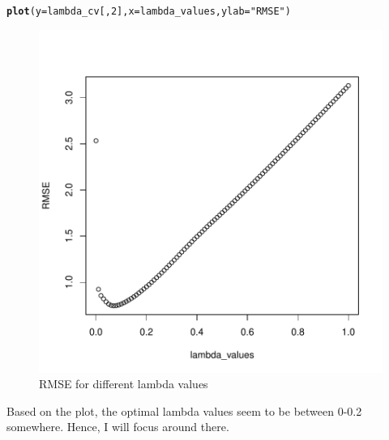 \documentclass[11pt, a4paper, english]{article}\usepackage[]{graphicx}\usepackage[dvipsnames]{xcolor}
\makeatletter
\def\maxwidth{ %
  \ifdim\Gin@nat@width>\linewidth
    \linewidth
  \else
    \Gin@nat@width
  \fi
}
\newcommand{\hlnum}[1]{\textcolor[rgb]{0.686,0.059,0.569}{#1}}%
\newcommand{\hlstr}[1]{\textcolor[rgb]{0.192,0.494,0.8}{#1}}%
\newcommand{\hlstd}[1]{\textcolor[rgb]{0.345,0.345,0.345}{#1}}%
\newcommand{\hlkwc}[1]{\textcolor[rgb]{0.333,0.667,0.333}{#1}}%
\newcommand{\hlkwd}[1]{\textcolor[rgb]{0.737,0.353,0.396}{\textbf{#1}}}%
\newenvironment{kframe}{%
 \def\at@end@of@kframe{}%
 \ifinner\ifhmode%
  \def\at@end@of@kframe{\end{minipage}}%
  \begin{minipage}{\columnwidth}%
 \fi\fi%
 \def\FrameCommand##1{\hskip\@totalleftmargin \hskip-\fboxsep
 \colorbox{shadecolor}{##1}\hskip-\fboxsep
     \hskip-\linewidth \hskip-\@totalleftmargin \hskip\columnwidth}%
 \MakeFramed {\advance\hsize-\width
   \@totalleftmargin\z@ \linewidth\hsize
   \@setminipage}}%
 {\par\unskip\endMakeFramed%
 \at@end@of@kframe}
\newenvironment{knitrout}{}{} %
\makeatother
\begin{document}
\begin{knitrout}
\color{fgcolor}\begin{kframe}
\begin{alltt}
\hlkwd{plot}\hlstd{(}\hlkwc{y}\hlstd{=lambda_cv[,}\hlnum{2}\hlstd{],} \hlkwc{x}\hlstd{=lambda_values,} \hlkwc{ylab} \hlstd{=} \hlstr{"RMSE"}\hlstd{)}
\end{alltt}
\end{kframe}\begin{figure}
\includegraphics[width=\maxwidth]{figure/unnamed-chunk-21-1} \caption[RMSE for different lambda values]{RMSE for different lambda values}\label{fig:unnamed-chunk-21}
\end{figure}

\end{knitrout}

Based on the plot, the optimal lambda values seem to be between 0-0.2 somewhere. Hence, I will focus around there.
\end{document}

